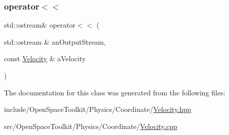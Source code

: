 \subsubsection{\texorpdfstring{operator$<$$<$}{operator<<}}
{\footnotesize\ttfamily std\+::ostream\& operator$<$$<$ (\begin{DoxyParamCaption}\item[{std\+::ostream \&}]{an\+Output\+Stream,  }\item[{const \hyperlink{classostk_1_1physics_1_1coord_1_1_velocity}{Velocity} \&}]{a\+Velocity }\end{DoxyParamCaption})\hspace{0.3cm}{\ttfamily [friend]}}



The documentation for this class was generated from the following files\+:\begin{DoxyCompactItemize}
\item 
include/\+Open\+Space\+Toolkit/\+Physics/\+Coordinate/\hyperlink{_velocity_8hpp}{Velocity.\+hpp}\item 
src/\+Open\+Space\+Toolkit/\+Physics/\+Coordinate/\hyperlink{_velocity_8cpp}{Velocity.\+cpp}\end{DoxyCompactItemize}
